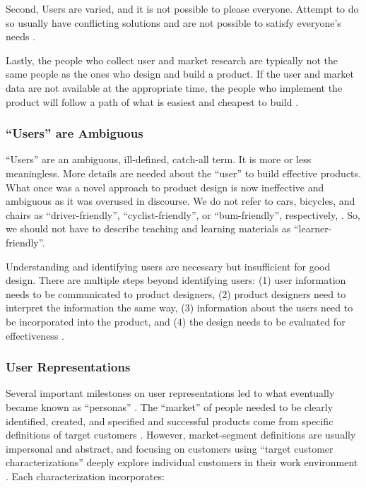 \documentclass[010-intro.tex]{subfiles}
\begin{document}
        Second,
        Users are varied, and it is not possible to please everyone.
        Attempt to do so usually have conflicting solutions and are not possible to satisfy everyone's needs
        \cite{pruittPersonaLifecycleKeeping2006}.
    
        Lastly,
        the people who collect user and market research are typically not the same people as the ones who
        design and build a product.
        If the user and market data are not available at the appropriate time,
        the people who implement the product will follow a path of what is easiest and cheapest to build
        \cite{pruittPersonaLifecycleKeeping2006}.

    \subsubsection{``Users'' are Ambiguous}
    
        ``Users'' are an ambiguous, ill-defined, catch-all term.
        It is more or less meaningless.
        More details are needed about the ``user'' to build effective products.
        What once was a novel approach to product design is now ineffective and ambiguous as it was overused in discourse.
        We do not refer to cars, bicycles, and chairs as
        ``driver-friendly'',
        ``cyclist-friendly'', or
        ``bum-friendly'', respectively,
        \cite{pruittPersonaLifecycleKeeping2006}.
        So, we should not have to describe teaching and learning materials as ``learner-friendly''.
    
        Understanding and identifying users are necessary but insufficient for good design.
        There are multiple steps beyond identifying users:
        (1) user information needs to be communicated to product designers,
        (2) product designers need to interpret the information the same way,
        (3) information about the users need to be incorporated into the product, and
        (4) the design needs to be evaluated for effectiveness
        \cite{pruittPersonaLifecycleKeeping2006}.

    \subsubsection{User Representations}
    
        Several important milestones on user representations led to what eventually became known as ``personas''
        \cite{pruittPersonaLifecycleKeeping2006}.
        The ``market'' of people needed to be clearly identified, created, and specified and
        successful products come from specific definitions of target customers
        \cite{sissorsWhatMarket1966, winstonDefiningYourMarket1998, pruittPersonaLifecycleKeeping2006}.
        However, market-segment definitions are usually impersonal and abstract, and focusing on
        customers using ``target customer characterizations'' deeply explore individual customers in their work environment
        \cite{mooreCrossingChasmMarketing1991, pruittPersonaLifecycleKeeping2006}.
        Each characterization incorporates:
    
\end{document}
